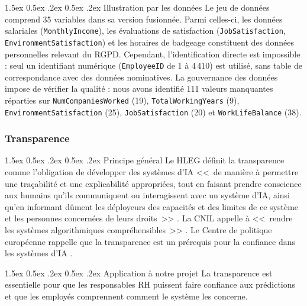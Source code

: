 \documentclass[12pt,a4paper]{article}
\makeatletter
\renewcommand\paragraph{\@startsection{paragraph}{4}{\z@}%
  {1.5ex \@plus 0.5ex \@minus .2ex}%
  {0.5ex \@plus .2ex}%
  {\normalfont\normalsize\bfseries}}
\makeatother
\begin{document}
\paragraph{Illustration par les données}
Le jeu de données comprend 35 variables dans sa version fusionnée. Parmi celles-ci, les données salariales (\texttt{MonthlyIncome}), les évaluations de satisfaction (\texttt{JobSatisfaction}, \texttt{EnvironmentSatisfaction}) et les horaires de badgeage constituent des données personnelles relevant du RGPD. Cependant, l'identification directe est impossible : seul un identifiant numérique (\texttt{EmployeeID} de 1 à 4\,410) est utilisé, sans table de correspondance avec des données nominatives. La gouvernance des données impose de vérifier la qualité : nous avons identifié 111 valeurs manquantes réparties sur \texttt{NumCompaniesWorked} (19), \texttt{TotalWorkingYears} (9), \texttt{EnvironmentSatisfaction} (25), \texttt{JobSatisfaction} (20) et \texttt{WorkLifeBalance} (38).

\subsubsection{Transparence}

\paragraph{Principe général}
Le HLEG définit la transparence comme l'obligation de développer des systèmes d'IA <<~de manière à permettre une traçabilité et une explicabilité appropriées, tout en faisant prendre conscience aux humains qu'ils communiquent ou interagissent avec un système d'IA, ainsi qu'en informant dûment les déployeurs des capacités et des limites de ce système et les personnes concernées de leurs droits~>> \cite{ia_act}. La CNIL appelle à <<~rendre les systèmes algorithmiques compréhensibles~>> \cite{cnil_ethique}. Le Centre de politique européenne rappelle que la transparence est un prérequis pour la confiance dans les systèmes d'IA \cite{cep_ethique}.

\paragraph{Application à notre projet}
La transparence est essentielle pour que les responsables RH puissent faire confiance aux prédictions et que les employés comprennent comment le système les concerne.
\end{document}

